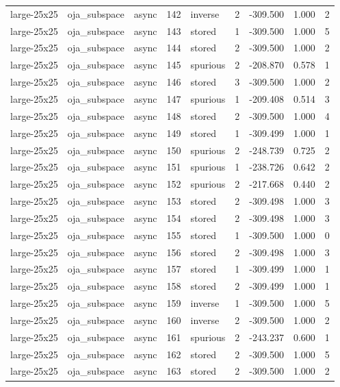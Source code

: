 \begin{tabular}{lllrlrrrr}
large-25x25 & oja\_subspace & async & 142 & inverse & 2 & -309.500 & 1.000 & 2 \\
large-25x25 & oja\_subspace & async & 143 & stored & 1 & -309.500 & 1.000 & 5 \\
large-25x25 & oja\_subspace & async & 144 & stored & 2 & -309.500 & 1.000 & 2 \\
large-25x25 & oja\_subspace & async & 145 & spurious & 2 & -208.870 & 0.578 & 1 \\
large-25x25 & oja\_subspace & async & 146 & stored & 3 & -309.500 & 1.000 & 2 \\
large-25x25 & oja\_subspace & async & 147 & spurious & 1 & -209.408 & 0.514 & 3 \\
large-25x25 & oja\_subspace & async & 148 & stored & 2 & -309.500 & 1.000 & 4 \\
large-25x25 & oja\_subspace & async & 149 & stored & 1 & -309.499 & 1.000 & 1 \\
large-25x25 & oja\_subspace & async & 150 & spurious & 2 & -248.739 & 0.725 & 2 \\
large-25x25 & oja\_subspace & async & 151 & spurious & 1 & -238.726 & 0.642 & 2 \\
large-25x25 & oja\_subspace & async & 152 & spurious & 2 & -217.668 & 0.440 & 2 \\
large-25x25 & oja\_subspace & async & 153 & stored & 2 & -309.498 & 1.000 & 3 \\
large-25x25 & oja\_subspace & async & 154 & stored & 2 & -309.498 & 1.000 & 3 \\
large-25x25 & oja\_subspace & async & 155 & stored & 1 & -309.500 & 1.000 & 0 \\
large-25x25 & oja\_subspace & async & 156 & stored & 2 & -309.498 & 1.000 & 3 \\
large-25x25 & oja\_subspace & async & 157 & stored & 1 & -309.499 & 1.000 & 1 \\
large-25x25 & oja\_subspace & async & 158 & stored & 2 & -309.499 & 1.000 & 1 \\
large-25x25 & oja\_subspace & async & 159 & inverse & 1 & -309.500 & 1.000 & 5 \\
large-25x25 & oja\_subspace & async & 160 & inverse & 2 & -309.500 & 1.000 & 2 \\
large-25x25 & oja\_subspace & async & 161 & spurious & 2 & -243.237 & 0.600 & 1 \\
large-25x25 & oja\_subspace & async & 162 & stored & 2 & -309.500 & 1.000 & 5 \\
large-25x25 & oja\_subspace & async & 163 & stored & 2 & -309.500 & 1.000 & 2 \\

\end{tabular}
